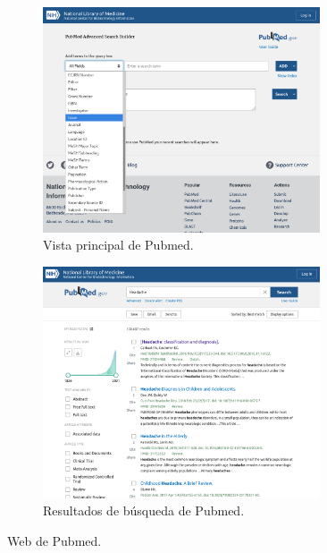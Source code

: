 \begin{figure}[h!]
    \begin{subfigure}[b]{0.45\linewidth}
    	\centering
		\includegraphics[width=0.9\textwidth]{images/Pubmed.png}
		\caption{Vista principal de Pubmed.}
		\label{fig:pubmed1}
	\end{subfigure}
	\begin{subfigure}[b]{0.45\linewidth} 
		\centering
		\includegraphics[width=0.9\textwidth]{images/Pubmed2.png}
		\caption{Resultados de búsqueda de Pubmed.}
		\label{fig:pubmed2}
	\end{subfigure}
	\caption{Web de Pubmed.}
	\label{fig:pubmed}
\end{figure}

\newpage
